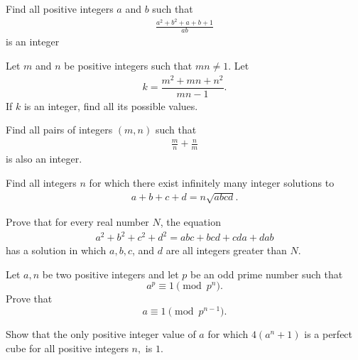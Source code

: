 \documentclass{subfile}
\begin{document}
	\begin{problem} %
		Find all positive integers $a$ and $b$ such that
			\begin{align*}
				 \frac{a^2+b^2+a+b+1}{ab}
			\end{align*}
		is an integer
	\end{problem}
	
	\begin{problem} %
		Let $m$ and $n$ be positive integers such that $mn \neq 1$. Let
			\begin{align*}
				k= \dfrac{m^2+mn+n^2}{mn-1}.
			\end{align*}
		If $k$ is an integer, find all its possible values.
	\end{problem}

	\begin{problem}
		Find all pairs of integers $( m, n )$ such that 
			\begin{align*}
				 \frac{ m } { n } + \frac{ n}{m}
			\end{align*}
		is also an integer.
	\end{problem}

	\begin{problem}[Vietnam 2002]
		Find all integers \(n\) for which there exist infinitely many integer solutions to
			\begin{align*}
				a + b + c + d = n \sqrt{ abcd }.
			\end{align*}
	\end{problem}
	
	\begin{problem}[Putnam 1933]
		Prove that for every real number $N$, the equation
			\begin{align*}
				a^2 + b^2 + c^2 + d^2 = abc + bcd + cda + dab
			\end{align*}
		has a solution in which $a, b, c$, and $d$ are all integers greater than $N$.
	\end{problem}
	
	\begin{problem}
		Let $a,n$ be two positive integers and let $p$ be an odd prime number such that
		\[a^p \equiv 1 \pmod{p^n}.\]
		Prove that
		\[a \equiv 1 \pmod{p^{n-1}}.\]
	\end{problem} 
	
	\begin{problem}
		Show that the only positive integer value of $a$ for which $4(a^n+1)$ is a perfect cube for all positive integers $n,$ is $1.$
	\end{problem} 
	
\end{document}

